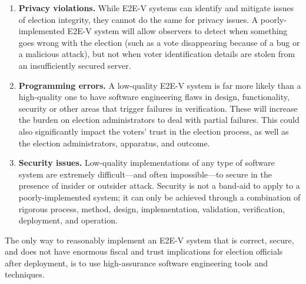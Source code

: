 \begin{enumerate}
\item \textbf{Privacy violations.} While E2E-V systems can identify
  and mitigate issues of election integrity, they cannot do the same
  for privacy issues. A poorly-implemented E2E-V system will allow
  observers to detect when something goes wrong with the election
  (such as a vote disappearing because of a bug or a malicious
  attack), but not when voter identification details are stolen from
  an insufficiently secured server.
\item \textbf{Programming errors.} A low-quality E2E-V system is far
  more likely than a high-quality one to have software engineering
  flaws in design, functionality, security or other areas that trigger
  failures in verification. These will increase the burden on election
  administrators to deal with partial failures. This could also
  significantly impact the voters' trust in the election process, as
  well as the election administrators, apparatus, and outcome.
\item \textbf{Security issues.} Low-quality implementations of any
  type of software system are extremely difficult---and often
  impossible---to secure in the presence of insider or outsider
  attack. Security is not a band-aid to apply to a poorly-implemented
  system; it can only be achieved through a combination of rigorous
  process, method, design, implementation, validation, verification,
  deployment, and operation.
\end{enumerate}

The only way to reasonably implement an E2E-V system that is correct,
secure, and does not have enormous fiscal and trust implications for
election officials after deployment, is to use high-assurance software
engineering tools and techniques.

